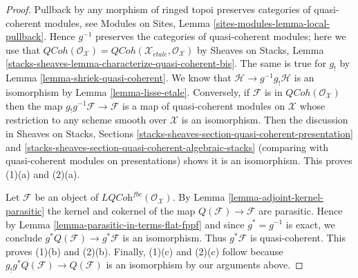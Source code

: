 \documentclass[10pt,a4paper]{amsart}
\theoremstyle{plain}
\theoremstyle{definition}
\theoremstyle{remark}
\numberwithin{equation}{subsection}
\def\etale{{\acute{e}tale}}
\def\QCoh{\mathit{QCoh}}
\begin{document}
\begin{proof}
Pullback by any morphism of ringed topoi preserves categories of quasi-coherent
modules, see
Modules on Sites, Lemma \ref{sites-modules-lemma-local-pullback}.
Hence $g^{-1}$ preserves the categories of quasi-coherent modules;
here we use that
$\QCoh(\mathcal{O}_\mathcal{X}) =
\QCoh(\mathcal{X}_\etale, \mathcal{O}_\mathcal{X})$
by Sheaves on Stacks, Lemma
\ref{stacks-sheaves-lemma-characterize-quasi-coherent-bis}.
The same is true for $g_!$ by
Lemma \ref{lemma-shriek-quasi-coherent}.
We know that $\mathcal{H} \to g^{-1}g_!\mathcal{H}$ is an isomorphism by
Lemma \ref{lemma-lisse-etale}.
Conversely, if $\mathcal{F}$ is in $\QCoh(\mathcal{O}_\mathcal{X})$
then the map $g_!g^{-1}\mathcal{F} \to \mathcal{F}$ is a map of quasi-coherent
modules on $\mathcal{X}$ whose restriction to any scheme smooth over
$\mathcal{X}$ is an isomorphism. Then the discussion in
Sheaves on Stacks, Sections
\ref{stacks-sheaves-section-quasi-coherent-presentation} and
\ref{stacks-sheaves-section-quasi-coherent-algebraic-stacks}
(comparing with quasi-coherent modules on presentations)
shows it is an isomorphism. This proves (1)(a) and (2)(a).

\medskip\noindent
Let $\mathcal{F}$ be an object of
$\textit{LQCoh}^{fbc}(\mathcal{O}_\mathcal{X})$. By
Lemma \ref{lemma-adjoint-kernel-parasitic}
the kernel and cokernel of the map
$Q(\mathcal{F}) \to \mathcal{F}$ are parasitic. Hence by
Lemma \ref{lemma-parasitic-in-terms-flat-fppf}
and since $g^* = g^{-1}$ is exact, we conclude
$g^*Q(\mathcal{F}) \to g^*\mathcal{F}$ is an isomorphism. Thus
$g^*\mathcal{F}$ is quasi-coherent. This proves (1)(b) and (2)(b).
Finally, (1)(c) and (2)(c) follow because
$g_!g^*Q(\mathcal{F}) \to Q(\mathcal{F})$ is an isomorphism by
our arguments above.
\end{proof}
\end{document}
